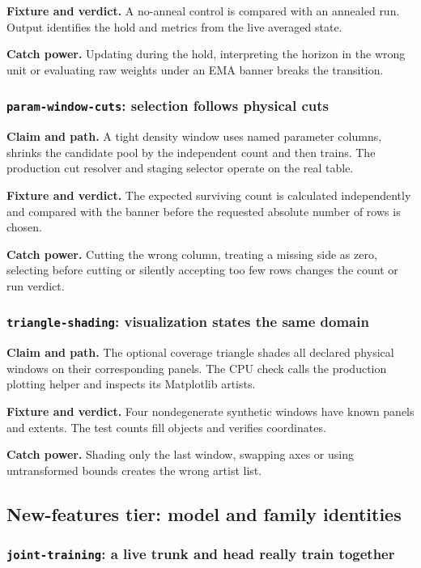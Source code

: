 \documentclass[10pt,aps,prd,twocolumn,nofootinbib]{revtex4-2}
\newcommand{\code}[1]{\texttt{#1}}
\begin{document}
\textbf{Fixture and verdict.}  A no-anneal control is compared with an
annealed run.  Output identifies the hold and metrics from the live averaged
state.

\textbf{Catch power.}  Updating during the hold, interpreting the horizon in
the wrong unit or evaluating raw weights under an EMA banner breaks the
transition.

\subsubsection{\code{param-window-cuts}: selection follows physical cuts}

\textbf{Claim and path.}  A tight density window uses named parameter columns,
shrinks the candidate pool by the independent count and then trains.  The
production cut resolver and staging selector operate on the real table.

\textbf{Fixture and verdict.}  The expected surviving count is calculated
independently and compared with the banner before the requested absolute
number of rows is chosen.

\textbf{Catch power.}  Cutting the wrong column, treating a missing side as
zero, selecting before cutting or silently accepting too few rows changes
the count or run verdict.

\subsubsection{\code{triangle-shading}: visualization states the same domain}

\textbf{Claim and path.}  The optional coverage triangle shades all declared
physical windows on their corresponding panels.  The CPU check calls the
production plotting helper and inspects its Matplotlib artists.

\textbf{Fixture and verdict.}  Four nondegenerate synthetic windows have known
panels and extents.  The test counts fill objects and verifies coordinates.

\textbf{Catch power.}  Shading only the last window, swapping axes or using
untransformed bounds creates the wrong artist list.

\subsection{New-features tier: model and family identities}

\subsubsection{\code{joint-training}: a live trunk and head really train together}
\end{document}
